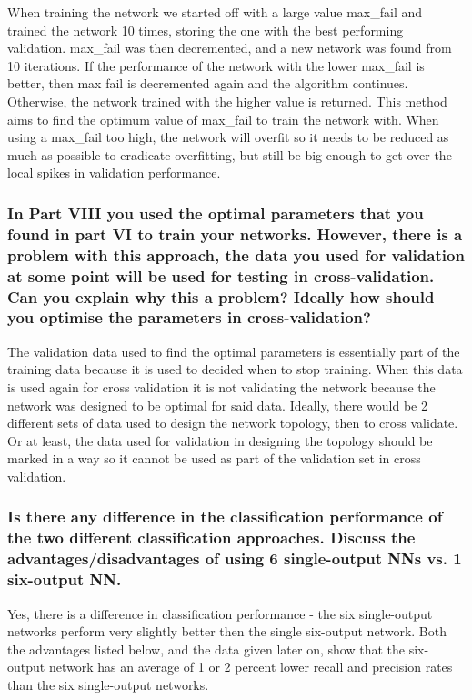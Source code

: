 \documentclass[12pt]{article}
\begin{document}
When training the network we started off with a large value max\_fail and trained the network 10 times, storing the one with the best performing validation. max\_fail was then decremented, and a new network was found from 10 iterations. If the performance of the network with the lower max\_fail is better, then max fail is decremented again and the algorithm continues. Otherwise, the network trained with the higher value is returned. This method aims to find the optimum value of max\_fail to train the network with. When using a max\_fail too high, the network will overfit so it needs to be reduced as much as possible to eradicate overfitting, but still be big enough to get over the local spikes in validation performance. 


\subsubsection*{In Part VIII you used the optimal parameters that you found in part VI to train your networks. However, there is a problem with this approach, the data you used for validation at some point will be used for testing in cross-validation. Can you explain why this a problem? Ideally how should you optimise the parameters in cross-validation?}

The validation data used to find the optimal parameters is essentially part of the training data because it is used to decided when to stop training. When this data is used again for cross validation it is not validating the network because the network was designed to be optimal for said data. Ideally, there would be 2 different sets of data used to design the network topology, then to cross validate. Or at least, the data used for validation in designing the topology should be marked in a way so it cannot be used as part of the validation set in cross validation.

\subsubsection*{Is there any difference in the classification performance of the two different classification approaches. Discuss the advantages/disadvantages of using 6 single-output NNs vs. 1 six-output NN.}

Yes, there is a difference in classification performance - the six single-output networks perform very slightly better then the single six-output network. Both the advantages listed below, and the data given later on, show that the six-output network has an average of 1 or 2 percent lower recall and precision rates than the six single-output networks. \\
\end{document}
